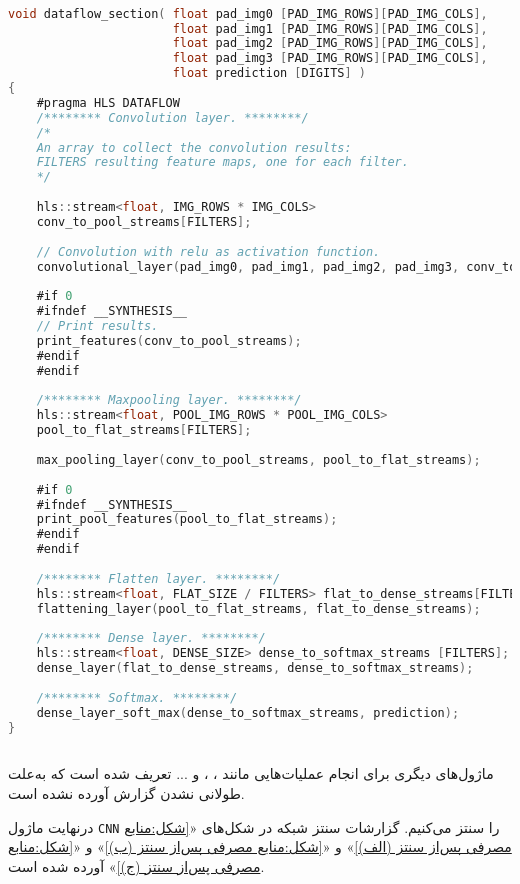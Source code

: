 \begin{latin}
\begin{lstlisting}[language=C,caption={HLS Implementation of \texttt{Data flow}  Module}]

void dataflow_section( float pad_img0 [PAD_IMG_ROWS][PAD_IMG_COLS],
					   float pad_img1 [PAD_IMG_ROWS][PAD_IMG_COLS],
					   float pad_img2 [PAD_IMG_ROWS][PAD_IMG_COLS],
					   float pad_img3 [PAD_IMG_ROWS][PAD_IMG_COLS],
					   float prediction [DIGITS] )
{
	#pragma HLS DATAFLOW
	/******** Convolution layer. ********/
	/*
	An array to collect the convolution results:
	FILTERS resulting feature maps, one for each filter.
	*/
	
	hls::stream<float, IMG_ROWS * IMG_COLS>
	conv_to_pool_streams[FILTERS];
	
	// Convolution with relu as activation function.
	convolutional_layer(pad_img0, pad_img1, pad_img2, pad_img3, conv_to_pool_streams);
	
	#if 0
	#ifndef __SYNTHESIS__
	// Print results.
	print_features(conv_to_pool_streams);
	#endif
	#endif
	
	/******** Maxpooling layer. ********/
	hls::stream<float, POOL_IMG_ROWS * POOL_IMG_COLS>
	pool_to_flat_streams[FILTERS];
	
	max_pooling_layer(conv_to_pool_streams, pool_to_flat_streams);
	
	#if 0
	#ifndef __SYNTHESIS__
	print_pool_features(pool_to_flat_streams);
	#endif
	#endif
	
	/******** Flatten layer. ********/
	hls::stream<float, FLAT_SIZE / FILTERS> flat_to_dense_streams[FILTERS];
	flattening_layer(pool_to_flat_streams, flat_to_dense_streams);
	
	/******** Dense layer. ********/
	hls::stream<float, DENSE_SIZE> dense_to_softmax_streams [FILTERS];
	dense_layer(flat_to_dense_streams, dense_to_softmax_streams);
	
	/******** Softmax. ********/
	dense_layer_soft_max(dense_to_softmax_streams, prediction);
}
	
\end{lstlisting}
\end{latin}



ماژول‌های دیگری برای انجام عملیات‌هایی مانند ، ،  و ... تعریف شده است که به‌علت طولانی نشدن گزارش آورده نشده است.




درنهایت ماژول \texttt{CNN} را سنتز می‌کنیم. گزارشات سنتز شبکه در شکل‌های «\ref{شکل:منابع مصرفی پس‌از سنتز (الف)}» و «\ref{شکل:منابع مصرفی پس‌از سنتز (ب)}» و «\ref{شکل:منابع مصرفی پس‌از سنتز (ج)}» آورده شده است.





